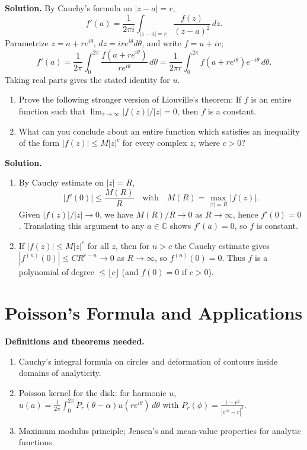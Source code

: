 \noindent\textbf{Solution.}
By Cauchy's formula on $|z-a|=r$,
\[f'(a)=\frac{1}{2\pi i}\int_{|z-a|=r} \frac{f(z)}{(z-a)^2}\,dz.\]
Parametrize $z=a+re^{i\theta}$, $dz=ire^{i\theta}d\theta$, and write $f=u+iv$;
\[f'(a)=\frac{1}{2\pi}\int_0^{2\pi} \frac{f(a+re^{i\theta})}{re^{i\theta}}\,d\theta=\frac{1}{2\pi r}\int_0^{2\pi} f(a+re^{i\theta})e^{-i\theta}\,d\theta.\]
Taking real parts gives the stated identity for $u$.

\begin{problembox}
\begin{enumerate}[label=(\alph*)]
\item Prove the following stronger version of Liouville's theorem: If \( f \) is an entire function such that \( \lim_{z \to \infty} |f(z)|/|z| = 0 \), then \( f \) is a constant.
\item What can you conclude about an entire function which satisfies an inequality of the form \( |f(z)| \leq M|z|^c \) for every complex \( z \), where \( c > 0 \)?
\end{enumerate}
\end{problembox}

\noindent\textbf{Solution.}
\begin{enumerate}[label=(\alph*)]
\item By Cauchy estimate on $|z|=R$,
\[|f'(0)|\le \frac{M(R)}{R} \quad\text{with}\quad M(R)=\max_{|z|=R}|f(z)|.\]
Given $|f(z)|/|z|\to0$, we have $M(R)/R\to0$ as $R\to\infty$, hence $f'(0)=0$. Translating this argument to any $a\in\mathbb C$ shows $f'(a)=0$, so $f$ is constant.
\item If $|f(z)|\le M|z|^c$ for all $z$, then for $n>c$ the Cauchy estimate gives $|f^{(n)}(0)|\le C R^{c-n}\to0$ as $R\to\infty$, so $f^{(n)}(0)=0$. Thus $f$ is a polynomial of degree $\le \lfloor c\rfloor$ (and $f(0)=0$ if $c>0$).
\end{enumerate}

\section{Poisson's Formula and Applications}

\noindent\textbf{Definitions and theorems needed.}
\begin{enumerate}[label=(\alph*)]
\item Cauchy's integral formula on circles and deformation of contours inside domains of analyticity.
\item Poisson kernel for the disk: for harmonic $u$, $u(a)=\frac{1}{2\pi}\int_0^{2\pi} P_r(\theta-\alpha)u(re^{i\theta})\,d\theta$ with $P_r(\phi)=\frac{1-r^2}{|e^{i\phi}-r|^2}$.
\item Maximum modulus principle; Jensen's and mean-value properties for analytic functions.
\end{enumerate}

